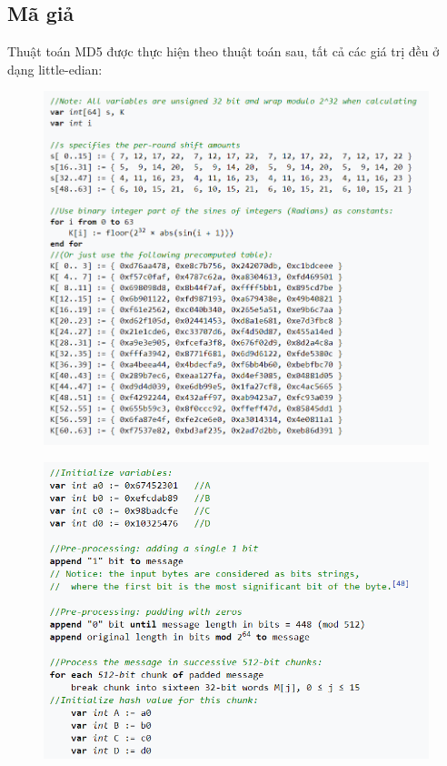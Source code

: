 \documentclass[../report.tex]{subfiles}
\begin{document}
\subsection{Mã giả}
Thuật toán MD5 được thực hiện theo thuật toán sau, tất cả các giá trị đều ở dạng little-edian:
\begin{figure}[H]
    \centering
    \includegraphics[width=\textwidth]{figures/al.png}
\end{figure}
\begin{figure}[H]
    \centering
    \includegraphics[width=\textwidth]{figures/al2.png}
\end{figure}
\end{document}
